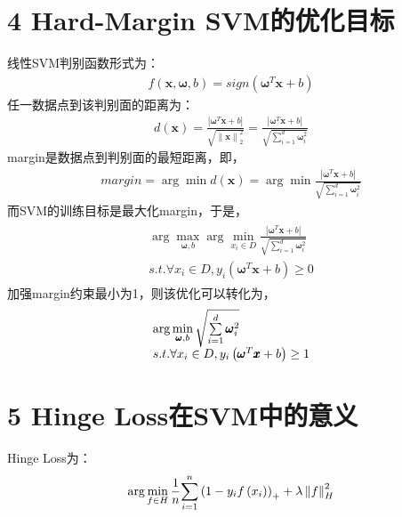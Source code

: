 \documentclass{article}
\begin{document}
\section*{4 Hard-Margin SVM的优化目标}
线性SVM判别函数形式为：
\begin{align*}
	f\left( {\pmb{x},\pmb{\omega},b} \right) = 
	sign\left( {{\pmb{\omega} ^T}\pmb{x} + b} \right)
\end{align*}
任一数据点到该判别面的距离为：
\begin{align*}
	d\left( \pmb{x} \right) 
	= \frac{{\left| {{\pmb{\omega} ^T}\pmb{x} + b} \right|}}{{\sqrt {\left\| \pmb{x} \right\|_2^2} }} 
	= \frac{{\left| {{\pmb{\omega} ^T}\pmb{x} + b} \right|}}{{\sqrt {\sum\limits_{i = 1}^d {\pmb{\omega} _i^2} } }}
\end{align*}
margin是数据点到判别面的最短距离，即，
\begin{align*}
	margin = 
	\arg\min d\left( \pmb{x} \right) 
	= \arg\min \frac{{\left| {{\pmb{\omega} ^T}\pmb{x} + b} \right|}}{{\sqrt {\sum\limits_{i = 1}^d {\pmb{\omega} _i^2} } }}
\end{align*}
而SVM的训练目标是最大化margin，于是，
\begin{align*}
	\begin{array}{l}
		\arg \mathop {\max }\limits_{\pmb{\omega} ,b} \arg \mathop {\min }\limits_{{x_i} \in D} \frac{{\left| {{\pmb{\omega} ^T}\pmb{x} + b} \right|}}{{\sqrt {\sum\limits_{i = 1}^d {\pmb{\omega} _i^2} } }}\\
		s.t.\forall {x_i} \in D,{y_i}\left( {{\pmb{\omega} ^T}\pmb{x} + b} \right) \ge 0
		\end{array}
\end{align*}
加强margin约束最小为1，则该优化可以转化为，
\begin{align*}
	\begin{array}{l}
		\arg \mathop {{\rm{min}}}\limits_{\pmb{\omega} ,b} \sqrt {\sum\limits_{i = 1}^d {\pmb{\omega} _i^2} } \\
		s.t.\forall {x_i} \in D,{y_i}\left( {{\pmb{\omega} ^T}\pmb{x} + b} \right) \ge 1
		\end{array}
\end{align*}

\section*{5 Hinge Loss在SVM中的意义}
Hinge Loss为：
\begin{align*}
	\arg \mathop {{\rm{min}}}\limits_{f \in H} \frac{1}{n}{\sum\limits_{i = 1}^n 
	{\left( {1 - {y_i}f\left( {{x_i}} \right)} \right)} _ + } 
	+ \lambda \left\| f \right\|_H^2
\end{align*}
\end{document}
